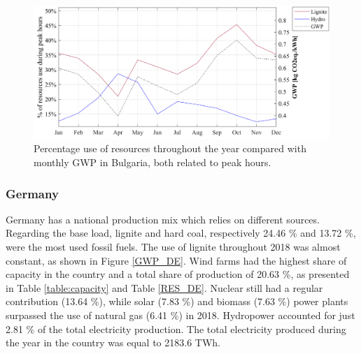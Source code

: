 {{	
\begin{figure}[htbp]
	\centering
	\includegraphics[width=1\textwidth]{ChapterLCA/Images/GWP_plots/Comp_GWP_BG.png}
	\caption{Percentage use of resources throughout the year compared with monthly GWP in Bulgaria, both related to peak hours.}
	\label{COMP_BG}
\end{figure}



\subsubsection{Germany}
Germany has a national production mix which relies on different sources. Regarding the base load, lignite and hard coal, {respectively 24.46 \% and 13.72 \%,} were the most used fossil fuels. The use of lignite throughout 2018 was almost constant, as shown in Figure \ref{GWP_DE}. Wind farms had the highest share of capacity in the country and a total share of production of 20.63 \%, as presented in Table \ref{table:capacity} and Table \ref{RES_DE}. Nuclear still had  a regular contribution {(13.64 \%)}, while solar {(7.83 \%)} and biomass {(7.63 \%)} power plants surpassed the use of natural gas {(6.41 \%)} in 2018. Hydropower accounted for just 2.81 \% of the total electricity production. The total electricity produced during the year in the country was equal to 2183.6 TWh. 


}}
